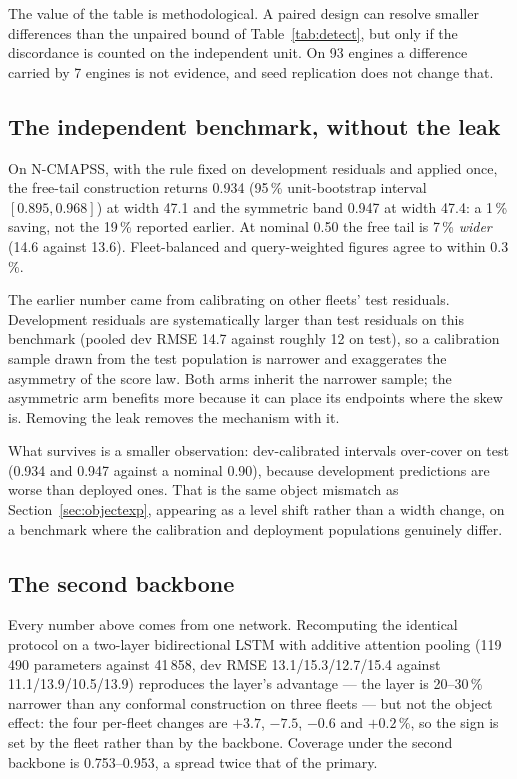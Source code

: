 \documentclass[journal]{IEEEtran}
\begin{document}
The value of the table is methodological. A paired design can resolve smaller differences than
the unpaired bound of Table~\ref{tab:detect}, but only if the discordance is counted on the
independent unit. On 93 engines a difference carried by 7 engines is not evidence, and seed
replication does not change that.

\subsection{The independent benchmark, without the leak}\label{sec:ncmapss}

On N-CMAPSS, with the rule fixed on development residuals and applied once, the free-tail
construction returns 0.934 (95\,\% unit-bootstrap interval $[0.895,0.968]$) at width 47.1 and
the symmetric band 0.947 at width 47.4: a 1\,\% saving, not the 19\,\% reported earlier. At
nominal 0.50 the free tail is 7\,\% \emph{wider} (14.6 against 13.6). Fleet-balanced and
query-weighted figures agree to within 0.3\,\%.

The earlier number came from calibrating on other fleets' test residuals. Development residuals
are systematically larger than test residuals on this benchmark (pooled dev RMSE 14.7 against
roughly 12 on test), so a calibration sample drawn from the test population is narrower and
exaggerates the asymmetry of the score law. Both arms inherit the narrower sample; the
asymmetric arm benefits more because it can place its endpoints where the skew is. Removing the
leak removes the mechanism with it.

What survives is a smaller observation: dev-calibrated intervals over-cover on test (0.934 and
0.947 against a nominal 0.90), because development predictions are worse than deployed ones.
That is the same object mismatch as Section~\ref{sec:objectexp}, appearing as a level shift
rather than a width change, on a benchmark where the calibration and deployment populations
genuinely differ.

\subsection{The second backbone}

Every number above comes from one network. Recomputing the identical protocol on a two-layer
bidirectional LSTM with additive attention pooling (119\,490 parameters against 41\,858, dev
RMSE 13.1/15.3/12.7/15.4 against 11.1/13.9/10.5/13.9) reproduces the layer's advantage --- the
layer is 20--30\,\% narrower than any conformal construction on three fleets --- but not the
object effect: the four per-fleet changes are $+3.7$, $-7.5$, $-0.6$ and $+0.2\,\%$, so the sign
is set by the fleet rather than by the backbone. Coverage under the second backbone is
0.753--0.953, a spread twice that of the primary.
\end{document}
